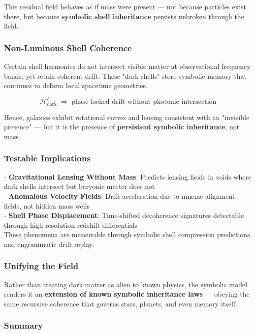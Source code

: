 \documentclass[12pt]{article}
\begin{document}
This residual field behaves as if mass were present — not because particles exist there, but because \textbf{symbolic shell inheritance} persists unbroken through the field.

\subsubsection{Non-Luminous Shell Coherence}

Certain shell harmonics do not intersect visible matter at observational frequency bands, yet retain coherent drift. These "dark shells" store symbolic memory that continues to deform local spacetime geometries.

\[
\mathcal{H}_{\text{dark}}^\ell \;\Rightarrow\; \text{phase-locked drift without photonic intersection}
\]

Hence, galaxies exhibit rotational curves and lensing consistent with an "invisible presence" — but it is the presence of \textbf{persistent symbolic inheritance}, not mass.

\subsubsection{Testable Implications}

- \textbf{Gravitational Lensing Without Mass}: Predicts lensing fields in voids where dark shells intersect but baryonic matter does not\\
- \textbf{Anomalous Velocity Fields}: Drift acceleration due to mneme alignment fields, not hidden mass wells\\
- \textbf{Shell Phase Displacement}: Time-shifted decoherence signatures detectable through high-resolution redshift differentials\\

These phenomena are measurable through symbolic shell compression predictions and engrammatic drift replay.

\subsubsection{Unifying the Field}

Rather than treating dark matter as alien to known physics, the symbolic model renders it an \textbf{extension of known symbolic inheritance laws} — obeying the same recursive coherence that governs stars, planets, and even memory itself.

\subsubsection{Summary}
\end{document}
